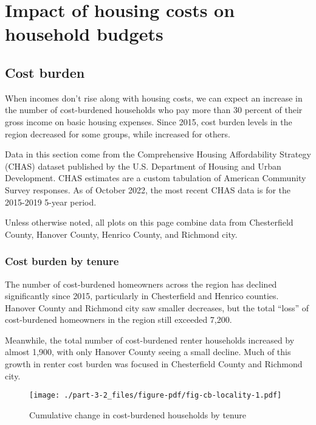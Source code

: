 \documentclass[
  letterpaper,
  DIV=11,
  numbers=noendperiod]{scrreprt}
\begin{document}
\hypertarget{part-3-2}{%
\chapter{Impact of housing costs on household budgets}\label{part-3-2}}

\hypertarget{cost-burden}{%
\section{Cost burden}\label{cost-burden}}

When incomes don't rise along with housing costs, we can expect an
increase in the number of cost-burdened households who pay more than 30
percent of their gross income on basic housing expenses. Since 2015,
cost burden levels in the region decreased for some groups, while
increased for others.

Data in this section come from the Comprehensive Housing Affordability
Strategy (CHAS) dataset published by the U.S. Department of Housing and
Urban Development. CHAS estimates are a custom tabulation of American
Community Survey responses. As of October 2022, the most recent CHAS
data is for the 2015-2019 5-year period.

Unless otherwise noted, all plots on this page combine data from
Chesterfield County, Hanover County, Henrico County, and Richmond city.

\hypertarget{cost-burden-by-tenure}{%
\subsection{Cost burden by tenure}\label{cost-burden-by-tenure}}

The number of cost-burdened homeowners across the region has declined
significantly since 2015, particularly in Chesterfield and Henrico
counties. Hanover County and Richmond city saw smaller decreases, but
the total ``loss'' of cost-burdened homeowners in the region still
exceeded 7,200.

Meanwhile, the total number of cost-burdened renter households increased
by almost 1,900, with only Hanover County seeing a small decline. Much
of this growth in renter cost burden was focused in Chesterfield County
and Richmond city.

\begin{figure}

{\centering \texttt{[image: ./part-3-2\_files/figure-pdf/fig-cb-locality-1.pdf]}

}

\caption{\label{fig-cb-locality}Cumulative change in cost-burdened
households by tenure}

\end{figure}
\end{document}
